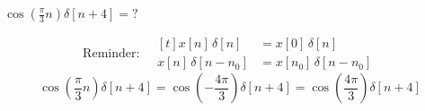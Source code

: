 \documentclass[11pt,a4paper]{article}
\begin{document}
\begin{ornek}[6)]
$\cos\left(\frac{\pi}{3}n\right)\delta[n+4] = ?$
\end{ornek}
\[
\text{Reminder:}\quad
\begin{aligned}[t]
x[n]\,\delta[n] &= x[0]\,\delta[n]\\
x[n]\,\delta[n-n_0] &= x[n_0]\,\delta[n-n_0]
\end{aligned}
\]
\[
\cos\left(\frac{\pi}{3}n\right)\delta[n+4] = \cos\left(-\frac{4\pi}{3}\right)\delta[n+4] = \cos\left(\frac{4\pi}{3}\right)\delta[n+4]
\]
\end{document}
